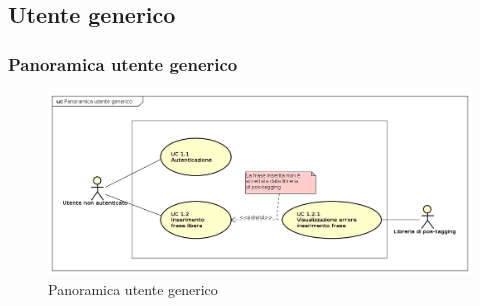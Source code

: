 \subsection{Utente generico}
\subsubsection{Panoramica utente generico}
\begin{figure}[H]
\centering
\includegraphics[width=17cm]{img/PanoramicaUtenteGenerico.png} 
\caption{Panoramica utente generico}\label{fig:1}
\end{figure}


